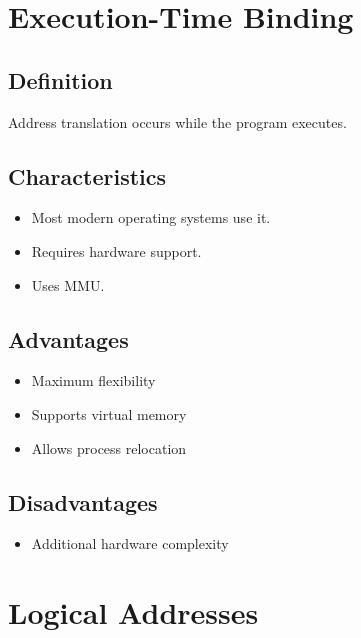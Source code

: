 \section{Execution-Time Binding}

\subsection{Definition}

Address translation occurs while the program executes.

\subsection{Characteristics}

\begin{itemize}
\item Most modern operating systems use it.
\item Requires hardware support.
\item Uses MMU.
\end{itemize}

\subsection{Advantages}

\begin{itemize}
\item Maximum flexibility
\item Supports virtual memory
\item Allows process relocation
\end{itemize}

\subsection{Disadvantages}

\begin{itemize}
\item Additional hardware complexity
\end{itemize}

\section{Logical Addresses}

